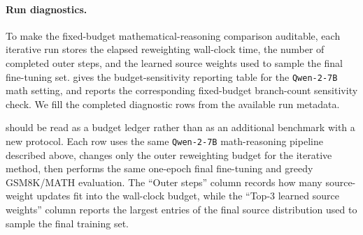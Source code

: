 \documentclass{article}
\theoremstyle{normaltheorem}
\begin{document}
\paragraph{Run diagnostics.}
To make the fixed-budget mathematical-reasoning comparison auditable, each iterative run stores the elapsed reweighting
wall-clock time, the number of completed outer steps, and the learned source weights used to sample the final fine-tuning
set.  gives the budget-sensitivity reporting table for the \texttt{Qwen-2-7B} math
setting, and  reports the corresponding fixed-budget branch-count sensitivity check.
We fill the completed diagnostic rows from the available run metadata.

 should be read as a budget ledger rather than as an additional benchmark with a new protocol. Each row uses the same \texttt{Qwen-2-7B} math-reasoning pipeline described above, changes only the outer reweighting budget for the iterative method, then performs the same one-epoch final fine-tuning and greedy GSM8K/MATH evaluation. The ``Outer steps'' column records how many source-weight updates fit into the wall-clock budget, while the ``Top-3 learned source weights'' column reports the largest entries of the final source distribution used to sample the final training set.
\end{document}
